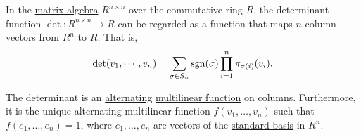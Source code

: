 \begin{proposition}\label{thm:determinant_on_columns}
  In the \hyperref[thm:matrix_algebra]{matrix algebra} \( R^{n \times n} \) over the commutative ring \( R \), the determinant function \( \det: R^{n \times n} \to R \) can be regarded as a function that maps \( n \) column vectors from \( R^n \) to \( R \). That is,
  \begin{equation}\label{eq:thm:determinant_on_columns}
    \det(v_1, \cdots, v_n) = \sum_{\sigma \in S_n} \operatorname{sgn}(\sigma) \prod_{i=1}^n \pi_{\sigma(i)} (v_i).
  \end{equation}

  The determinant is an \hyperref[def:alternating_function]{alternating} \hyperref[def:multilinear_function]{multilinear function} on columns. Furthermore, it is the unique alternating multilinear function \( f(v_1, \ldots, v_n) \) such that \( f(e_1, \ldots, e_n) = 1 \), where \( e_1, \ldots, e_n \) are vectors of the \hyperref[def:standard_basis]{standard basis} in \( R^n \).
\end{proposition}
